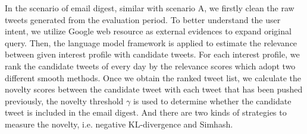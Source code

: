 In the scenario of email digest, similar with scenario A,
we firstly clean the raw tweets generated from the evaluation period.
To better understand the user intent,
we utilize Google web resource as external evidences to expand original query.
Then, the language model framework is applied to estimate the relevance between given interest profile with candidate tweets.
For each interest profile,
we rank the candidate tweets of every day by the relevance scores which adopt two different smooth methods. 
Once we obtain the ranked tweet list,
we calculate the novelty scores between the candidate tweet with each tweet that has been pushed previously,
the novelty threshold $\gamma$ is used to determine whether the candidate tweet is included in the email digest.
And there are two kinds of strategies to measure the novelty, i.e. negative KL-divergence and Simhash.


